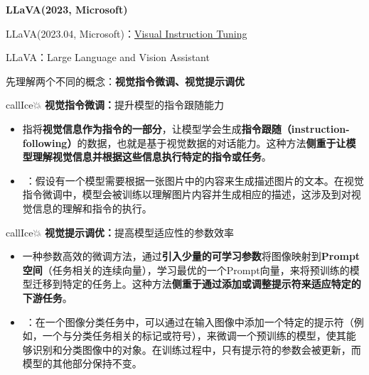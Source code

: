 \documentclass[zihao=false,fontset=windows]{ctexart}
\newcommand{\feiEmoji}[1]{{\emojifont #1}}
\begin{document}
{\bfseries LLaVA(2023, Microsoft)\par}

\begin{feishuquote}
LLaVA(2023.04, Microsoft)：\href{https://arxiv.org/abs/2304.08485}{Visual Instruction Tuning}\par
LLaVA：Large Language and Vision Assistant\par
\end{feishuquote}

先理解两个不同的概念：\textbf{视觉指令微调、视觉提示调优}\par

\begin{tcbraster}[raster columns=2, raster equal height=rows, raster column skip=9pt, raster row skip=8pt, raster left skip=0pt, raster right skip=0pt]
\begin{feishuboxnb}{callIce}{💥}
\textbf{视觉指令微调：}\textcolor{feishuBlue}{提升模型的指令跟随能力}\par
\begin{itemize}
\item 指将\textcolor{feishuRed}{\textbf{视觉信息作为指令的一部分}}，让模型学会生成\textbf{指令跟随（instruction-following）}的数据，也就是基于视觉数据的对话能力。这种方法\textbf{侧重于让模型理解视觉信息并根据这些信息执行特定的指令或任务}。
\item {\feiEmoji{🌰}}：\textcolor{feishuGreen}{假设有一个模型需要根据一张图片中的内容来生成描述图片的文本。在视觉指令微调中，模型会被训练以理解图片内容并生成相应的描述，这涉及到对视觉信息的理解和指令的执行}。
\end{itemize}
\end{feishuboxnb}
\begin{feishuboxnb}{callIce}{💥}
\textbf{视觉提示调优：}\textcolor{feishuBlue}{提高模型适应性的参数效率}\par
\begin{itemize}
\item 一种参数高效的微调方法，通过\textcolor{feishuRed}{\textbf{引入少量的可学习参数}}将图像映射到\textbf{Prompt空间}（任务相关的连续向量），学习最优的一个Prompt向量，来将预训练的模型迁移到特定的任务上。这种方法\textbf{侧重于通过添加或调整提示符来适应特定的下游任务}。
\item {\feiEmoji{🌰}}：\textcolor{feishuGreen}{在一个图像分类任务中，可以通过在输入图像中添加一个特定的提示符（例如，一个与分类任务相关的标记或符号），来微调一个预训练的模型，使其能够识别和分类图像中的对象。在训练过程中，只有提示符的参数会被更新，而模型的其他部分保持不变。}
\end{itemize}
\end{feishuboxnb}
\end{tcbraster}
\end{document}
